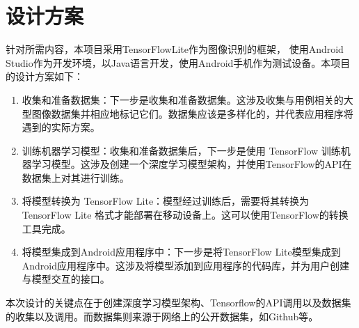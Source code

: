 %
%
%
%

\section{设计方案}
针对所需内容，本项目采用TensorFlow\hspace{0.5em}Lite作为图像识别的框架，
使用Android Studio作为开发环境，以Java语言开发，使用Android手机作为测试设备。本项目的设计方案如下：
\begin{enumerate}
    \item 收集和准备数据集：下一步是收集和准备数据集。这涉及收集与用例相关的大型图像数据集并相应地标记它们。数据集应该是多样化的，并代表应用程序将遇到的实际方案。
    \item 训练机器学习模型：收集和准备数据集后，下一步是使用 TensorFlow 训练机器学习模型。这涉及创建一个深度学习模型架构，并使用TensorFlow的API在数据集上对其进行训练。
    \item 将模型转换为 TensorFlow Lite：模型经过训练后，需要将其转换为 TensorFlow Lite 格式才能部署在移动设备上。这可以使用TensorFlow的转换工具完成。
    \item 将模型集成到Android应用程序中：下一步是将TensorFlow Lite模型集成到Android应用程序中。这涉及将模型添加到应用程序的代码库，并为用户创建与模型交互的接口。
\end{enumerate}
本次设计的关键点在于创建深度学习模型架构、Tensorflow的API调用以及数据集的收集以及调用。而数据集则来源于网络上的公开数据集，如Github等。
